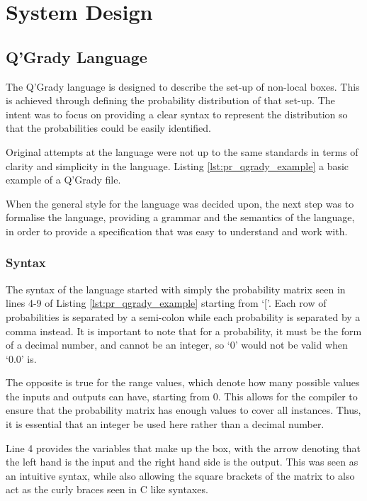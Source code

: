 \documentclass[report.tex]{subfiles}
\begin{document}
\chapter{System Design} %
\label{cha:system_design}
\section{Q'Grady Language} %
\label{sec:q_grady_language}
The Q'Grady language is designed to describe the set-up of non-local boxes.
This is achieved through defining the probability distribution of that set-up.
The intent was to focus on providing a clear syntax to represent the
distribution so that the probabilities could be easily identified. 

Original attempts at the language were not up to the same standards in terms of
clarity and simplicity in the language. Listing \ref{lst:pr_qgrady_example}
a basic example of a Q'Grady file.

 

When the general style for the language was decided upon, the next step was to
formalise the language, providing a grammar and the semantics of the language,
in order to provide a specification that was easy to understand and work with.

\subsection{Syntax} %
\label{sub:syntax}
The syntax of the language started with simply the probability matrix seen in
lines 4-9 of Listing \ref{lst:pr_qgrady_example} starting from `['. Each row of
probabilities is separated by a semi-colon while each probability is separated
by a comma instead. It is important to note that for a probability, it must be
the form of a decimal number, and cannot be an integer, so `0' would not be
valid when `0.0' is.

The opposite is true for the range values, which denote how many possible values
the inputs and outputs can have, starting from 0. This allows for the compiler
to ensure that the probability matrix has enough values to cover all instances.
Thus, it is essential that an integer be used here rather than a decimal number.

Line 4 provides the variables that make up the box, with the arrow denoting that
the left hand is the input and the right hand side is the output. This was seen
as an intuitive syntax, while also allowing the square brackets of the matrix to
also act as the curly braces seen in C like syntaxes.
\end{document}
